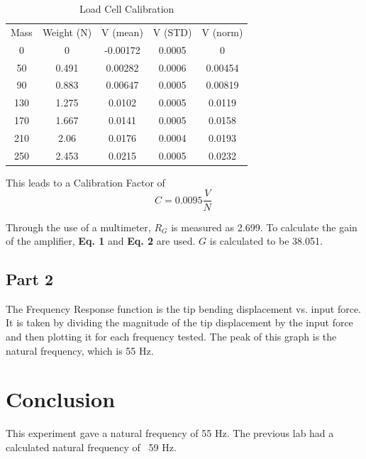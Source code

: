 \documentclass{article}
\begin{document}
\begin{table}
    \centering
    \begin{tabular}{ccccc}
         Mass&  Weight (N)&  V (mean)&  V (STD)&  V (norm)   \\
         0&  0&  -0.00172&  0.0005&  0   \\
         50&  0.491&  0.00282&  0.0006&  0.00454   \\
         90&  0.883&  0.00647&  0.0005&  0.00819   \\
         130&  1.275&  0.0102&  0.0005&  0.0119  \\
 170& 1.667& 0.0141& 0.0005& 0.0158 \\
 210& 2.06& 0.0176& 0.0004& 0.0193 \\
 250& 2.453& 0.0215& 0.0005& 0.0232 \\
    \end{tabular}
    \caption{Load Cell Calibration}
    \label{tab:my_label}
\end{table}

This leads to a Calibration Factor of \begin{equation} C = 0.0095 \dfrac{V}{N}\ \end{equation}

Through the use of a multimeter, \(R_{G}\) is measured as 2.699\Omega\).  To calculate the gain of the amplifier, \textbf{Eq. 1} and \textbf{Eq. 2} are used. \(G\) is calculated to be 38.051.
\subsection{Part 2} 

The Frequency Response function is the tip bending displacement vs. input force.  It is taken by dividing the magnitude of the tip displacement by the input force and then plotting it for each frequency tested.  
The peak of this graph is the natural frequency, which is 55 Hz.  
\section{Conclusion}

This experiment gave a natural frequency of 55 Hz.  The previous lab had a calculated natural frequency of ~59 Hz.  
\end{document}
